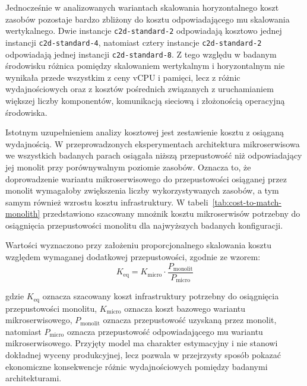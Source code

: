 Jednocześnie w analizowanych wariantach skalowania horyzontalnego koszt zasobów pozostaje bardzo zbliżony do kosztu odpowiadającego mu skalowania wertykalnego. Dwie instancje \texttt{c2d-standard-2} odpowiadają kosztowo jednej instancji \texttt{c2d-standard-4}, natomiast cztery instancje \texttt{c2d-standard-2} odpowiadają jednej instancji \texttt{c2d-standard-8}. Z tego względu w badanym środowisku różnica pomiędzy skalowaniem wertykalnym i horyzontalnym nie wynikała przede wszystkim z ceny vCPU i pamięci, lecz z różnic wydajnościowych oraz z kosztów pośrednich związanych z uruchamianiem większej liczby komponentów, komunikacją sieciową i złożonością operacyjną środowiska.

Istotnym uzupełnieniem analizy kosztowej jest zestawienie kosztu z osiąganą wydajnością. W przeprowadzonych eksperymentach architektura mikroserwisowa we wszystkich badanych parach osiągała niższą przepustowość niż odpowiadający jej monolit przy porównywalnym poziomie zasobów. Oznacza to, że doprowadzenie wariantu mikroserwisowego do przepustowości osiąganej przez monolit wymagałoby zwiększenia liczby wykorzystywanych zasobów, a tym samym również wzrostu kosztu infrastruktury. W tabeli~\ref{tab:cost-to-match-monolith} przedstawiono szacowany mnożnik kosztu mikroserwisów potrzebny do osiągnięcia przepustowości monolitu dla najwyższych badanych konfiguracji.

Wartości wyznaczono przy założeniu proporcjonalnego skalowania kosztu względem wymaganej dodatkowej przepustowości, zgodnie ze wzorem:
\begin{equation}
    K_{\mathrm{eq}} = K_{\mathrm{micro}} \cdot \frac{P_{\mathrm{monolit}}}{P_{\mathrm{micro}}}
\end{equation}

gdzie $K_{\mathrm{eq}}$ oznacza szacowany koszt infrastruktury potrzebny do osiągnięcia przepustowości monolitu, $K_{\mathrm{micro}}$ oznacza koszt bazowego wariantu mikroserwisowego, $P_{\mathrm{monolit}}$ oznacza przepustowość uzyskaną przez monolit, natomiast $P_{\mathrm{micro}}$ oznacza przepustowość odpowiadającego mu wariantu mikroserwisowego. Przyjęty model ma charakter estymacyjny i nie stanowi dokładnej wyceny produkcyjnej, lecz pozwala w przejrzysty sposób pokazać ekonomiczne konsekwencje różnic wydajnościowych pomiędzy badanymi architekturami.

